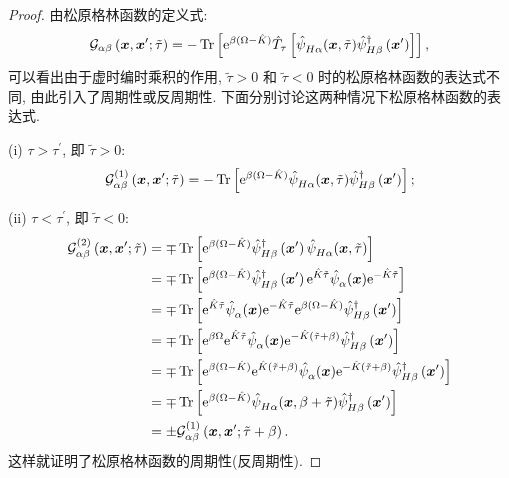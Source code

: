 \begin{proof}
由松原格林函数的定义式:
\begin{equation}
\mathcal{G}_{\alpha \beta}\left(\boldsymbol{x}, \boldsymbol{x}^{\prime} ; \tilde{\tau}\right)=-\operatorname{Tr}\left[\mathrm{e}^{\beta(\Omega-\hat{K})} \hat{T}_\tau\left[\hat{\psi}^{}_{H \alpha}(\boldsymbol{x}, \tilde{\tau}) \hat{\psi}_{H\beta}^{\dagger}\left(\boldsymbol{x}^{\prime}\right)\right]\right],
\end{equation}
可以看出由于虚时编时乘积的作用, $\tilde{\tau}>0$ 和 $\tilde{\tau}<0$ 时的松原格林函数的表达式不同, 由此引入了周期性或反周期性. 下面分别讨论这两种情况下松原格林函数的表达式.

(i) $\tau>\tau^{\prime}$, 即 $\tilde{\tau}>0$:
\begin{equation}
\mathcal{G}^{(1)}_{\alpha \beta}\left(\boldsymbol{x}, \boldsymbol{x}^{\prime} ; \tilde{\tau}\right)  =-\operatorname{Tr}\left[\mathrm{e}^{\beta(\Omega-\hat{K})} \hat{\psi}^{}_{H \alpha}(\boldsymbol{x}, \tilde{\tau}) \hat{\psi}_{H\beta}^{\dagger}\left(\boldsymbol{x}^{\prime}\right)\right] ;
\end{equation}

(ii) $\tau<\tau^{\prime}$, 即 $\tilde{\tau}<0$:
\begin{align}
\mathcal{G}^{(2)}_{\alpha \beta}\left(\boldsymbol{x}, \boldsymbol{x}^{\prime} ; \tilde{\tau}\right) & =\mp \operatorname{Tr}\left[\mathrm{e}^{\beta(\Omega-\hat{K})} \hat{\psi}_{H\beta}^{\dagger}\left(\boldsymbol{x}^{\prime}\right) \hat{\psi}^{}_{H \alpha}(\boldsymbol{x}, \tilde{\tau})\right] \nonumber\\
& =\mp \operatorname{Tr}\left[\mathrm{e}^{\beta(\Omega-\hat{K})} \hat{\psi}_{H\beta}^{\dagger}\left(\boldsymbol{x}^{\prime}\right) \mathrm{e}^{\hat{K} \tilde{\tau}} \hat{\psi}^{}_\alpha(\boldsymbol{x}) \mathrm{e}^{-\hat{K} \tilde{\tau}}\right]\nonumber \\
& =\mp \operatorname{Tr}\left[\mathrm{e}^{\hat{K} \tilde{\tau}} \hat{\psi}^{}_\alpha(\boldsymbol{x}) \mathrm{e}^{-\hat{K} \tilde{\tau}} \mathrm{e}^{\beta(\Omega-\hat{K})} \hat{\psi}_{H\beta}^{\dagger}\left(\boldsymbol{x}^{\prime}\right)\right]\nonumber \\
& =\mp \operatorname{Tr}\left[\mathrm{e}^{\beta \Omega} \mathrm{e}^{\hat{K} \tilde{\tau}} \hat{\psi}^{}_\alpha(\boldsymbol{x}) \mathrm{e}^{-\hat{K}(\tilde{\tau}+\beta)} \hat{\psi}_{H\beta}^{\dagger}\left(\boldsymbol{x}^{\prime}\right)\right] \nonumber\\
& =\mp \operatorname{Tr}\left[\mathrm{e}^{\beta(\Omega-\hat{K})} \mathrm{e}^{\hat{K}(\tilde{\tau}+\beta)} \hat{\psi}^{}_\alpha(\boldsymbol{x}) \mathrm{e}^{-\hat{K}(\tilde{\tau}+\beta)} \hat{\psi}_{H\beta}^{\dagger}\left(\boldsymbol{x}^{\prime}\right)\right] \nonumber\\
& =\mp \operatorname{Tr}\left[\mathrm{e}^{\beta(\Omega-\hat{K})}  \hat{\psi}^{}_{H\alpha}(\boldsymbol{x},\beta+ \tilde{\tau})  \hat{\psi}_{H\beta}^{\dagger}\left(\boldsymbol{x}^{\prime}\right)\right]\nonumber \\
& =\pm \mathcal{G}^{(1)}_{\alpha \beta}\left(\boldsymbol{x}, \boldsymbol{x}^{\prime} ; \tilde{\tau}+\beta\right) .
\end{align}
这样就证明了松原格林函数的周期性(反周期性).
\end{proof}

